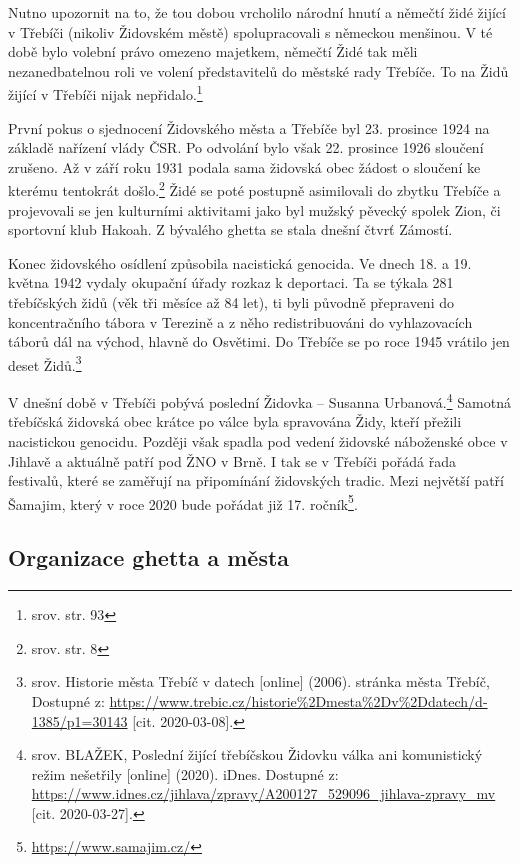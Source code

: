 \documentclass[a4paper,oneside,12pt]{report}
\begin{document}
Nutno upozornit na to, že tou dobou vrcholilo národní hnutí a němečtí židé žijící v Třebíči (nikoliv Židovském městě) spolupracovali s německou menšinou.
V té době bylo volební právo omezeno majetkem, němečtí Židé tak měli nezanedbatelnou roli ve volení představitelů do městské rady Třebíče.
To na  Židů žijící v Třebíči nijak nepřidalo.\footnote{srov. \cite{Janak1981} str. 93}

První pokus o sjednocení Židovského města a Třebíče byl 23. prosince 1924 na základě nařízení vlády ČSR.
Po odvolání bylo však 22. prosince 1926 sloučení zrušeno.
Až v září roku 1931 podala sama židovská obec žádost o sloučení ke kterému tentokrát došlo.\footnote{srov. \cite{Klenovsky2003} str. 8}
Židé se poté postupně asimilovali do zbytku Třebíče a projevovali se jen kulturními aktivitami jako byl mužský pěvecký spolek Zion, či sportovní klub Hakoah.
Z bývalého ghetta se stala dnešní čtvrť Zámostí.

Konec židovského osídlení způsobila nacistická genocida.
Ve dnech 18. a 19. května 1942 vydaly okupační úřady rozkaz k deportaci.
Ta se týkala 281 třebíčských židů (věk tři měsíce až 84 let), ti byli původně přepraveni do koncentračního tábora v Terezině a z něho redistribuováni do vyhlazovacích táborů dál na východ, hlavně do Osvětimi.
Do Třebíče se po roce 1945 vrátilo jen deset Židů.\footnote{srov. Historie města Třebíč v datech [online] (2006). stránka města Třebíč, Dostupné z: \url{https://www.trebic.cz/historie\%2Dmesta\%2Dv\%2Ddatech/d-1385/p1=30143} [cit. 2020-03-08]. }

V dnešní době v Třebíči pobývá poslední Židovka -- Susanna Urbanová.\footnote{srov. BLAŽEK, Poslední žijící třebíčskou Židovku válka ani komunistický režim nešetřily [online] (2020). iDnes. Dostupné z: \url{https://www.idnes.cz/jihlava/zpravy/A200127_529096_jihlava-zpravy_mv} [cit. 2020-03-27].}
Samotná třebíčská židovská obec krátce po válce byla spravována Židy, kteří přežili nacistickou genocidu.
Později však spadla pod vedení židovské náboženské obce v Jihlavě a aktuálně patří pod ŽNO v Brně.
I tak se v Třebíči pořádá řada festivalů, které se zaměřují na připomínání židovských tradic.
Mezi největší patří Šamajim, který v roce 2020 bude pořádat již 17. ročník\footnote{\url{https://www.samajim.cz/}}.

\subsection{Organizace ghetta a města}
\end{document}
